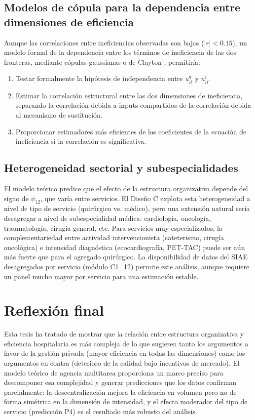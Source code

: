 \subsection{Modelos de cópula para la dependencia entre dimensiones de eficiencia}

Aunque las correlaciones entre ineficiencias observadas son bajas ($|r|<0.15$), un modelo formal de la dependencia entre los términos de ineficiencia de las dos fronteras, mediante cópulas gaussianas o de Clayton \citep{kumbhakar1997}, permitiría:

\begin{enumerate}[label=(\roman*)]
  \item Testar formalmente la hipótesis de independencia entre $u^q_{it}$ y $u^i_{it}$.
  \item Estimar la correlación estructural entre las dos dimensiones de ineficiencia, separando la correlación debida a inputs compartidos de la correlación debida al mecanismo de sustitución.
  \item Proporcionar estimadores más eficientes de los coeficientes de la ecuación de ineficiencia si la correlación es significativa.
\end{enumerate}

\subsection{Heterogeneidad sectorial y subespecialidades}

El modelo teórico predice que el efecto de la estructura organizativa depende del signo de $\psi_{12}$, que varía entre servicios. El Diseño C explota esta heterogeneidad a nivel de tipo de servicio (quirúrgico vs. médico), pero una extensión natural sería desagregar a nivel de subespecialidad médica: cardiología, oncología, traumatología, cirugía general, etc. Para servicios muy especializados, la complementariedad entre actividad intervencionista (cateterismo, cirugía oncológica) e intensidad diagnóstica (ecocardiografía, PET-TAC) puede ser aún más fuerte que para el agregado quirúrgico. La disponibilidad de datos del SIAE desagregados por servicio (módulo C1\_12) permite este análisis, aunque requiere un panel mucho mayor por servicio para una estimación estable.

\section{Reflexión final}

Esta tesis ha tratado de mostrar que la relación entre estructura organizativa y eficiencia hospitalaria es más compleja de lo que sugieren tanto los argumentos a favor de la gestión privada (mayor eficiencia en todas las dimensiones) como los argumentos en contra (deterioro de la calidad bajo incentivos de mercado). El modelo teórico de agencia multitarea proporciona un marco preciso para descomponer esa complejidad y generar predicciones que los datos confirman parcialmente: la descentralización mejora la eficiencia en volumen pero no de forma simétrica en la dimensión de intensidad, y el efecto moderador del tipo de servicio (predicción P4) es el resultado más robusto del análisis.

